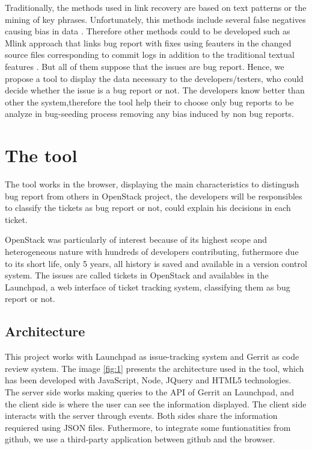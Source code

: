 \documentclass[ifip]{svmult}
\begin{document}
Traditionally, the methods used in link recovery \cite{Zimmermann, Thomas} are based on text patterns or the mining of key phrases. Unfortunately, this methods include several false negatives causing bias in data \cite{Bird, NguyenTH}. Therefore other methods could to be developed such as Mlink approach that links bug report with fixes using feauters in the changed source files corresponding to commit logs in addition to the traditional textual features \cite{Nguyen}. But all of them suppose that the issues are bug report. Hence, we propose a tool to display the data necessary to the developers/testers, who could decide whether the issue is a bug report or not. The developers know better than other the system,therefore the tool help their to choose only bug reports to be analyze in bug-seeding process removing any bias induced by non bug reports.
	

\section{The tool} 
\label{sec:2}
The tool works in the browser, displaying the main characteristics to distingush bug report from others in OpenStack project, the developers will be responsibles to classify the tickets as bug report or not, could explain his decisions in each ticket. 

OpenStack was particularly of interest because of its highest scope and heterogeneous nature with hundreds of developers contributing, futhermore due to its short life, only 5 years, all history is saved and available in a version control system. The issues are called tickets in OpenStack and availables in the Launchpad, a web interface of ticket tracking system, classifying them as bug report or not.

\subsection{Architecture}
This project works with Launchpad as issue-tracking system and Gerrit as code review system. The image \ref{fig:1} presents the architecture used in the tool, which has been developed with JavaScript, Node, JQuery and HTML5 technologies. The server side works making queries to the API of Gerrit an Launchpad, and the client side is where the user can see the information displayed. The client side interacts with the server through events. Both sides share the information requiered using JSON files. Futhermore, to integrate some funtionatities from github, we use a third-party application between github and the browser.
\end{document}
